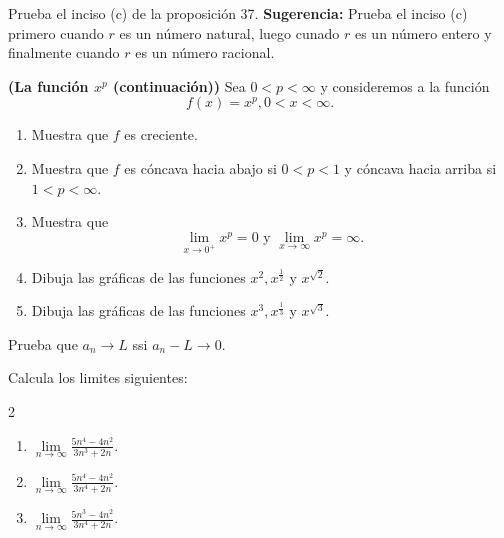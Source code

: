 \documentclass[12pt,a4paper]{article}
\begin{document}
    \begin{mdframed}[style=mdbluebox,frametitle={Ejercicio 4}]
        Prueba el inciso (c) de la proposición 37. \textbf{Sugerencia:} Prueba el
        inciso (c) primero cuando $r$ es un número natural, luego cunado $r$ es un número
        entero y finalmente cuando $r$ es un número racional.
    \end{mdframed}

    \begin{mdframed}[style=mdbluebox,frametitle={Ejercicio 5}]
        \textbf{(La función $x^{p}$ (continuación))} Sea $0\lt p\lt\infty$ y consideremos
        a la función
        \begin{equation*}
            f(x)=x^{p},0\lt x\lt\infty.
        \end{equation*}
        \begin{enumerate}
            \item[(a)] Muestra que $f$ es creciente.
            \item[(b)] Muestra que $f$ es cóncava hacia abajo si $0\lt p\lt1$ y cóncava
            hacia arriba si $1\lt p\lt\infty$.
            \item[(c)] Muestra que
            \begin{equation*}
                \lim_{x\to0^{+}}x^{p}=0\text{ y }\lim_{x\to\infty}x^{p}=\infty.
            \end{equation*}
            \item[(d)] Dibuja las gráficas de las funciones $x^{2},x^{\frac{1}{2}}$ y $x^{\sqrt{2}}$.
            \item[(e)] Dibuja las gráficas de las funciones $x^{3},x^{\frac{1}{3}}$ y $x^{\sqrt{3}}$. 
        \end{enumerate}
    \end{mdframed}

    \begin{mdframed}[style=mdbluebox,frametitle={Ejercicio 6}]
        Prueba que $a_{n}\to L$ ssi $a_{n}-L\to0$.
    \end{mdframed}

    \begin{mdframed}[style=mdbluebox,frametitle={Ejercicio 7}]
        Calcula los limites siguientes:
        \begin{multicols}{2}
            \begin{enumerate}
                \item[(a)]  $\underset{n\rightarrow\infty}{\lim}\frac{5n^{4}-4n^{2}}{3n^{3}+2n}.$
                \vspace{0.1cm}
                \item[(b)]  $\underset{n\rightarrow\infty}{\lim}\frac{5n^{4}-4n^{2}}{3n^{4}+2n}.$
                \vspace{0.1cm}
                \item[(c)]  $\underset{n\rightarrow\infty}{\lim}\frac{5n^{3}-4n^{2}}{3n^{4}+2n}.$
            \end{enumerate}
        \end{multicols}
    \end{mdframed}
\end{document}
